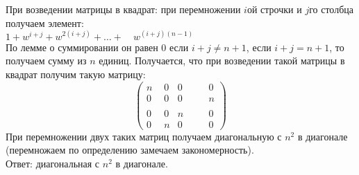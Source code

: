 \documentclass[a4paper,12pt]{article} %
\begin{document}
При возведении матрицы в квадрат: при перемножении $ i $ой строчки и $ j $го столбца получаем элемент:\\
$ 1 + w^{i+j} + w^{2(i+j)} + \ldots + \quad w^{(i+j)(n-1)}$\\
По лемме о суммировании он равен 0 если $ i + j \neq n+1 $, если $ i + j = n+1 $, то получаем сумму из $ n $ единиц. Получается, что при возведении такой матрицы в квадрат получим такую матрицу:
\begin{equation}
\begin{pmatrix}
n & 0 & 0 & \quad & 0\\
0 & 0 & 0 & \quad & n\\
\quad \\
0 & 0 & n & \quad & 0\\
0 & n & 0 & \quad & 0
\end{pmatrix}
\end{equation}
При перемножении двух таких матриц получаем диагональную с $ n^2 $ в диагонале (перемножаем по определению замечаем закономерность).\\

Ответ: диагональная с $ n^2 $ в диагонале.
\end{document}
